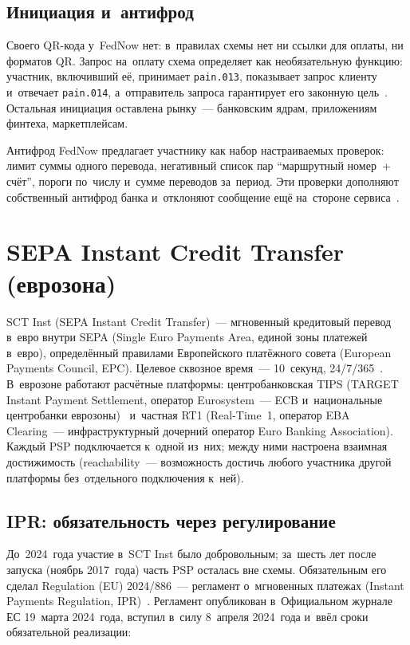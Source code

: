\subsection*{Инициация и~антифрод}\label{subsec:fednow-gaps}

Своего QR-кода у~FedNow нет: в~правилах схемы нет ни ссылки для оплаты, ни
форматов QR. Запрос на~оплату схема определяет как необязательную функцию:
участник, включивший её, принимает \texttt{pain.013}, показывает запрос клиенту
и~отвечает \texttt{pain.014}, а~отправитель запроса гарантирует его законную
цель~\cite{fednow-op-procedures}. Остальная инициация оставлена рынку~---
банковским ядрам, приложениям финтеха, маркетплейсам.

Антифрод FedNow предлагает участнику как набор настраиваемых проверок:
лимит суммы одного перевода, негативный список пар \enquote{маршрутный номер~+
счёт}, пороги по~числу и~сумме переводов за~период. Эти проверки дополняют
собственный антифрод банка и~отклоняют сообщение ещё на~стороне
сервиса~\cite{fednow-op-procedures}.

\section{SEPA Instant Credit Transfer (еврозона)}\label{sec:sepa-instant-system}

SCT Inst (SEPA Instant Credit Transfer)~--- мгновенный кредитовый перевод в~евро
внутри SEPA (Single Euro Payments Area, единой зоны платежей в~евро),
определённый правилами Европейского платёжного совета (European Payments
Council, EPC). Целевое сквозное время~--- 10~секунд, 24/7/365~\cite{epc-sct-inst-rulebook-2025}. В~еврозоне
работают расчётные платформы: центробанковская TIPS (TARGET Instant Payment
  Settlement, оператор Eurosystem~--- ECB и~национальные центробанки
еврозоны)~\cite{ecb-tips} и~частная RT1 (Real-Time~1, оператор EBA Clearing~---
инфраструктурный дочерний оператор Euro Banking Association). Каждый PSP
подключается к~одной из~них; между ними настроена взаимная достижимость
(reachability~--- возможность достичь любого участника другой платформы
без~отдельного подключения к~ней).

\subsection*{IPR: обязательность через регулирование}\label{subsec:sepa-ipr}

До~2024~года участие в~SCT Inst было добровольным; за~шесть лет после запуска
(ноябрь 2017~года) часть PSP осталась вне схемы. Обязательным его сделал
Regulation (EU) 2024/886~--- регламент о~мгновенных платежах (Instant Payments
Regulation, IPR)~\cite{eu-2024-886,ecb-ipr}. Регламент опубликован в~Официальном
журнале ЕС 19~марта 2024~года, вступил в~силу 8~апреля 2024~года и~ввёл сроки
обязательной реализации:


